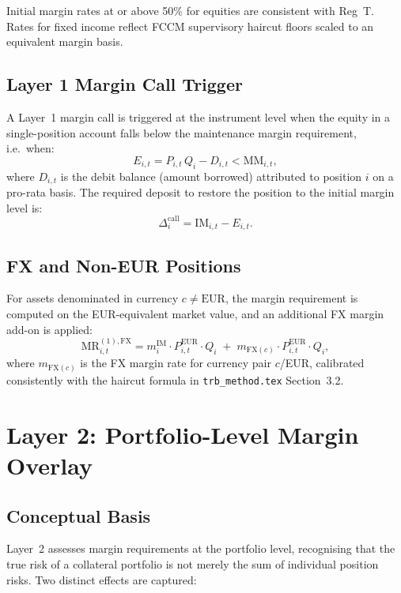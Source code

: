 \documentclass[12pt, a4paper]{article}
\newcommand{\MR}{\mathrm{MR}}
\newcommand{\IM}{\mathrm{IM}}
\newcommand{\MM}{\mathrm{MM}}
\begin{document}
\noindent Initial margin rates at or above 50\% for equities are consistent
with Reg~T. Rates for fixed income reflect FCCM supervisory haircut floors
scaled to an equivalent margin basis.

\subsection{Layer 1 Margin Call Trigger}

A Layer~1 margin call is triggered at the instrument level when the equity
in a single-position account falls below the maintenance margin requirement,
i.e.\ when:
\[
E_{i,t} = P_{i,t}\,Q_i - D_{i,t} < \MM_{i,t},
\]
where $D_{i,t}$ is the debit balance (amount borrowed) attributed to
position $i$ on a pro-rata basis. The required deposit to restore the
position to the initial margin level is:
\[
\Delta_i^{\mathrm{call}} = \IM_{i,t} - E_{i,t}.
\]

\subsection{FX and Non-EUR Positions}
\label{subsec:fx_layer1}

For assets denominated in currency $c \neq \mathrm{EUR}$, the margin
requirement is computed on the EUR-equivalent market value, and an
additional FX margin add-on is applied:
\begin{equation}
    \MR_{i,t}^{(1),\mathrm{FX}}
    = m_i^{\IM} \cdot P_{i,t}^{\mathrm{EUR}} \cdot Q_i
    \;+\; m_{\mathrm{FX}(c)} \cdot P_{i,t}^{\mathrm{EUR}} \cdot Q_i,
    \label{eq:layer1_fx}
\end{equation}
where $m_{\mathrm{FX}(c)}$ is the FX margin rate for currency pair
$c$/EUR, calibrated consistently with the haircut formula in
\texttt{trb\_method.tex} Section~3.2.

\section{Layer 2: Portfolio-Level Margin Overlay}
\label{sec:layer2}

\subsection{Conceptual Basis}

Layer~2 assesses margin requirements at the portfolio level, recognising
that the true risk of a collateral portfolio is not merely the sum of
individual position risks. Two distinct effects are captured:
\end{document}
